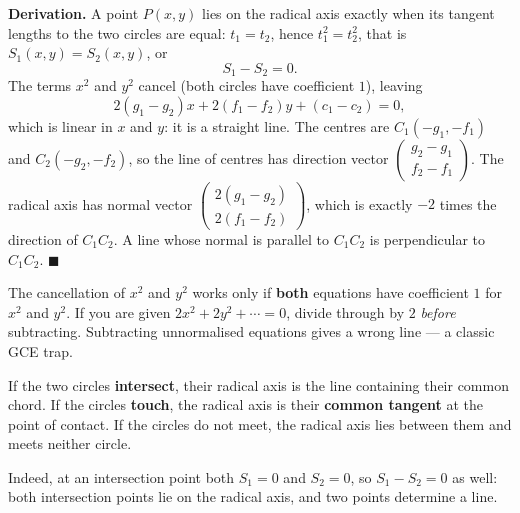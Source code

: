 \documentclass[11pt]{article}
\newcommand{\cle}[1]{{\popxbold\color{popdark}#1}}
\begin{document}
\textbf{Derivation.} A point $P(x, y)$ lies on the radical axis exactly when its tangent lengths to the two circles are equal: $t_1 = t_2$, hence $t_1^2 = t_2^2$, that is $S_1(x,y) = S_2(x,y)$, or
\[
S_1 - S_2 = 0.
\]
The terms $x^2$ and $y^2$ cancel (both circles have coefficient $1$), leaving
\[
2(g_1 - g_2)x + 2(f_1 - f_2)y + (c_1 - c_2) = 0,
\]
which is linear in $x$ and $y$: it is a straight line. The centres are $C_1(-g_1, -f_1)$ and $C_2(-g_2, -f_2)$, so the line of centres has direction vector $\begin{pmatrix} g_2 - g_1 \\ f_2 - f_1 \end{pmatrix}$. The radical axis has normal vector $\begin{pmatrix} 2(g_1 - g_2) \\ 2(f_1 - f_2) \end{pmatrix}$, which is exactly $-2$ times the direction of $C_1C_2$. A line whose normal is parallel to $C_1C_2$ is perpendicular to $C_1C_2$. $\blacksquare$

\begin{attention}
The cancellation of $x^2$ and $y^2$ works only if \textbf{both} equations have coefficient $1$ for $x^2$ and $y^2$. If you are given $2x^2 + 2y^2 + \cdots = 0$, divide through by $2$ \emph{before} subtracting. Subtracting unnormalised equations gives a wrong line — a classic GCE trap.
\end{attention}

\begin{propriete}
If the two circles \textbf{intersect}, their radical axis is the line containing their \cle{common chord}. If the circles \textbf{touch}, the radical axis is their \textbf{common tangent} at the point of contact. If the circles do not meet, the radical axis lies between them and meets neither circle.
\end{propriete}

Indeed, at an intersection point both $S_1 = 0$ and $S_2 = 0$, so $S_1 - S_2 = 0$ as well: both intersection points lie on the radical axis, and two points determine a line.
\end{document}
